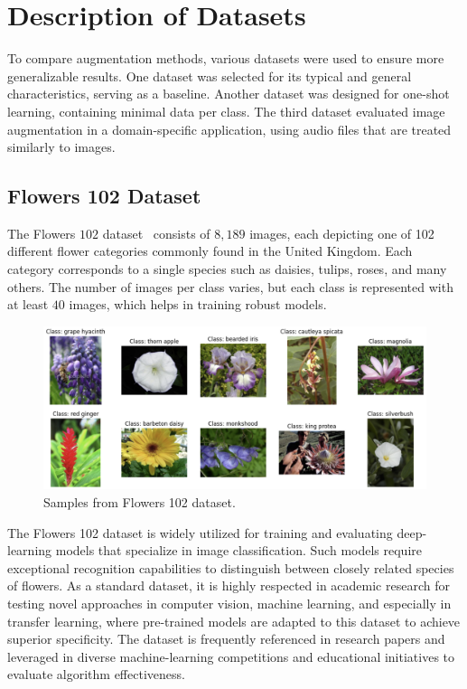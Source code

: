 \section{Description of Datasets}
\label{sec:datasets}

To compare augmentation methods, various datasets were used to ensure more generalizable results. One dataset was selected for its typical and general characteristics, serving as a baseline. Another dataset was designed for one-shot learning, containing minimal data per class. The third dataset evaluated image augmentation in a domain-specific application, using audio files that are treated similarly to images.


\subsection{Flowers 102 Dataset}
\label{ssec:Flowers102Dataset}

The Flowers $102$ dataset~\cite{Flowers102} consists of $8,189$ images, each depicting one of 102 different flower categories commonly found in the United Kingdom. Each category corresponds to a single species such as daisies, tulips, roses, and many others. The number of images per class varies, but each class is represented with at least $40$ images, which helps in training robust models.

\begin{figure}[!htb]
    \centering
    \includegraphics[scale=0.7]{Images/flowers-example.png}
    \caption{Samples from Flowers 102 dataset.}
    \label{fig:flowersExample}
\end{figure}

The Flowers 102 dataset is widely utilized for training and evaluating deep-learning models that specialize in image classification. Such models require exceptional recognition capabilities to distinguish between closely related species of flowers. As a standard dataset, it is highly respected in academic research for testing novel approaches in computer vision, machine learning, and especially in transfer learning, where pre-trained models are adapted to this dataset to achieve superior specificity. The dataset is frequently referenced in research papers and leveraged in diverse machine-learning competitions and educational initiatives to evaluate algorithm effectiveness.

